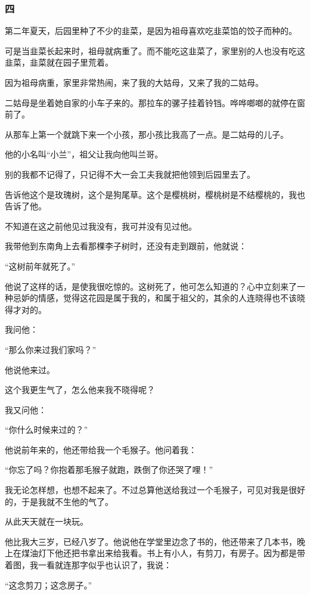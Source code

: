 \subsubsection*{四}
\par 第二年夏天，后园里种了不少的韭菜，是因为祖母喜欢吃韭菜馅的饺子而种的。
\par 可是当韭菜长起来时，祖母就病重了。而不能吃这韭菜了，家里别的人也没有吃这韭菜，韭菜就在园子里荒着。
\par 因为祖母病重，家里非常热闹，来了我的大姑母，又来了我的二姑母。
\par 二姑母是坐着她自家的小车子来的。那拉车的骡子挂着铃铛。哗哗啷啷的就停在窗前了。
\par 从那车上第一个就跳下来一个小孩，那小孩比我高了一点。是二姑母的儿子。
\par 他的小名叫“小兰”，祖父让我向他叫兰哥。
\par 别的我都不记得了，只记得不大一会工夫我就把他领到后园里去了。
\par 告诉他这个是玫瑰树，这个是狗尾草。这个是樱桃树，樱桃树是不结樱桃的，我也告诉了他。
\par 不知道在这之前他见过我没有，我可并没有见过他。
\par 我带他到东南角上去看那棵李子树时，还没有走到跟前，他就说：
\par “这树前年就死了。”
\par 他说了这样的话，是使我很吃惊的。这树死了，他可怎么知道的？心中立刻来了一种忌妒的情感，觉得这花园是属于我的，和属于祖父的，其余的人连晓得也不该晓得才对的。
\par 我问他：
\par “那么你来过我们家吗？”
\par 他说他来过。
\par 这个我更生气了，怎么他来我不晓得呢？
\par 我又问他：
\par “你什么时候来过的？”
\par 他说前年来的，他还带给我一个毛猴子。他问着我：
\par “你忘了吗？你抱着那毛猴子就跑，跌倒了你还哭了哩！”
\par 我无论怎样想，也想不起来了。不过总算他送给我过一个毛猴子，可见对我是很好的，于是我就不生他的气了。
\par 从此天天就在一块玩。
\par 他比我大三岁，已经八岁了。他说他在学堂里边念了书的，他还带来了几本书，晚上在煤油灯下他还把书拿出来给我看。书上有小人，有剪刀，有房子。因为都是带着图，我一看就连那字似乎也认识了，我说：
\par “这念剪刀；这念房子。”
